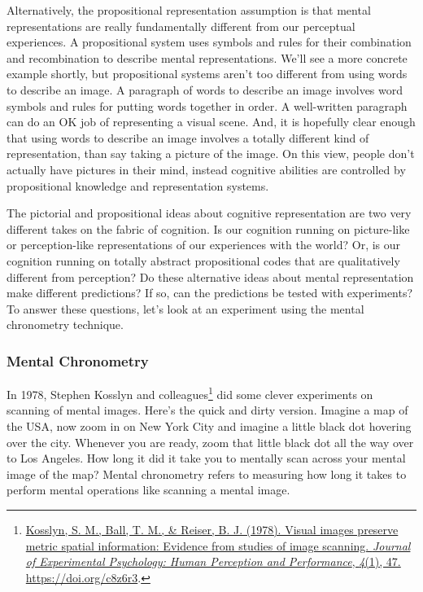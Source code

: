 \documentclass[
  oneside,
  12pt]{crumpbook}
\begin{document}
Alternatively, the propositional representation assumption is that mental representations are really fundamentally different from our perceptual experiences. A propositional system uses symbols and rules for their combination and recombination to describe mental representations. We'll see a more concrete example shortly, but propositional systems aren't too different from using words to describe an image. A paragraph of words to describe an image involves word symbols and rules for putting words together in order. A well-written paragraph can do an OK job of representing a visual scene. And, it is hopefully clear enough that using words to describe an image involves a totally different kind of representation, than say taking a picture of the image. On this view, people don't actually have pictures in their mind, instead cognitive abilities are controlled by propositional knowledge and representation systems.

The pictorial and propositional ideas about cognitive representation are two very different takes on the fabric of cognition. Is our cognition running on picture-like or perception-like representations of our experiences with the world? Or, is our cognition running on totally abstract propositional codes that are qualitatively different from perception? Do these alternative ideas about mental representation make different predictions? If so, can the predictions be tested with experiments? To answer these questions, let's look at an experiment using the mental chronometry technique.

\hypertarget{mental-chronometry}{%
\subsubsection{Mental Chronometry}\label{mental-chronometry}}

In 1978, Stephen Kosslyn and colleagues\footnote{\protect\hyperlink{ref-kosslynVisualImagesPreserve1978}{Kosslyn, S. M., Ball, T. M., \& Reiser, B. J. (1978). Visual images preserve metric spatial information: Evidence from studies of image scanning. \emph{Journal of Experimental Psychology: Human Perception and Performance}, \emph{4}(1), 47. \url{https://doi.org/c8z6r3}}.} did some clever experiments on scanning of mental images. Here's the quick and dirty version. Imagine a map of the USA, now zoom in on New York City and imagine a little black dot hovering over the city. Whenever you are ready, zoom that little black dot all the way over to Los Angeles. How long it did it take you to mentally scan across your mental image of the map? Mental chronometry refers to measuring how long it takes to perform mental operations like scanning a mental image.
\end{document}
